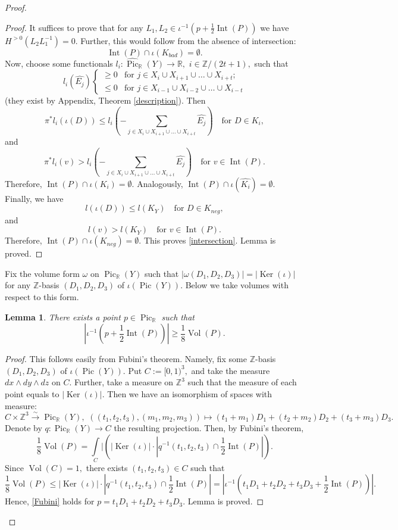 \documentclass[11pt,leqno]{amsart}
\newtheorem{lemma}[theo]{Lemma}
\numberwithin{equation}{section}
\def\R{\mathbb{R}}
\def\Z{\mathbb{Z}}
\newcommand{\Int}{\operatorname{Int}}
\newcommand{\Vol}{\operatorname{Vol}}
\newcommand{\Ker}{\operatorname{Ker}}
\newcommand{\Pic}{\operatorname{Pic}}
\begin{document}
\begin{proof}
\begin{proof} It suffices to prove that for any $L_1,L_2\in \iota^{-1}(p+\frac12 \Int(P))$ we have $H^{>0}(L_2L_1^{-1})=0.$
Further, this would follow from the absence of intersection:
\begin{equation}\label{intersection}\Int(P)\cap\iota(K_{bad})=\emptyset.\end{equation}
Now, choose some functionals $l_i:\widehat{\Pic}_{\R}(Y)\to\R,$ $i\in\Z/(2t+1),$ such that
$$l_i(\widehat{E_j})\begin{cases}\geq 0 &\text{for }j\in X_i\cup X_{i+1}\cup\dots\cup X_{i+t};\\
\leq 0 & \text{for }j\in X_{i-1}\cup X_{i-2}\cup\dots\cup X_{i-t}\end{cases}$$
(they exist by Appendix, Theorem \ref{description}).
Then $$\pi^*l_i(\iota(D))\leq l_i(-\sum\limits_{j\in X_i\cup X_{i+1}\cup\dots\cup X_{i+t}}\widehat{E_j})\quad\text{for }D\in K_i,$$
and $$\pi^*l_i(v)>l_i(-\sum\limits_{j\in X_i\cup X_{i+1}\cup\dots\cup X_{i+t}}\widehat{E_j})\quad\text{for }v\in \Int(P).$$
Therefore, $\Int(P)\cap\iota(K_i)=\emptyset.$ Analogously, $\Int(P)\cap\iota(\widehat{K_i})=\emptyset.$ Finally, we have
$$l(\iota(D))\leq l(K_Y)\quad\text{for }D\in K_{neg},$$
and
$$l(v)>l(K_Y)\quad\text{for }v\in\Int(P).$$
Therefore, $\Int(P)\cap\iota(K_{neg})=\emptyset.$ This proves \eqref{intersection}. Lemma is proved.
\end{proof}

Fix the volume form $\omega$ on $\Pic_{\R}(Y)$ such that $|\omega(D_1,D_2,D_3)|=|\Ker(\iota)|$ for
any $\Z$-basis $(D_1,D_2,D_3)$ of $\iota(\Pic(Y)).$ Below we take volumes with respect to this form.

\begin{lemma}\label{Fubini_lemma}There exists a point $p\in\Pic_{\R}$ such that
\begin{equation}\label{Fubini}|\iota^{-1}(p+\frac12 \Int(P))|\geq \frac18\Vol(P).\end{equation}\end{lemma}

\begin{proof}This follows easily from Fubini's theorem. Namely, fix some $\Z$-basis $(D_1,D_2,D_3)$ of $\iota(\Pic(Y)).$
Put $C:=[0,1)^3,$ and take the measure $dx\wedge dy\wedge dz$ on $C.$ Further, take a measure on $\Z^3$
such that the measure of each point equals to $|\Ker(\iota)|.$ Then we have an isomorphism of spaces with measure:
$$C\times\Z^3\stackrel{\sim}{\to}\Pic_{\R}(Y),\,\, ((t_1,t_2,t_3),(m_1,m_2,m_3))\mapsto (t_1+m_1)D_1+(t_2+m_2)D_2+(t_3+m_3)D_3.$$
Denote by $q:\Pic_{\R}(Y)\to C$ the resulting projection. Then, by Fubini's theorem,
$$\frac18\Vol(P)=\int\limits_{C}|(|\Ker(\iota)|\cdot |q^{-1}(t_1,t_2,t_3)\cap \frac12 \Int(P)|).$$
Since $\Vol(C)=1,$ there exists $(t_1,t_2,t_3)\in C$ such that
$$\frac18\Vol(P)\leq |\Ker(\iota)|\cdot |q^{-1}(t_1,t_2,t_3)\cap \frac12 \Int(P)|=|\iota^{-1}(t_1D_1+t_2D_2+t_3D_3+\frac12 \Int(P))|.$$
Hence, \eqref{Fubini} holds for $p=t_1D_1+t_2D_2+t_3D_3.$ Lemma is proved.
\end{proof}


\end{proof}
\end{document}
